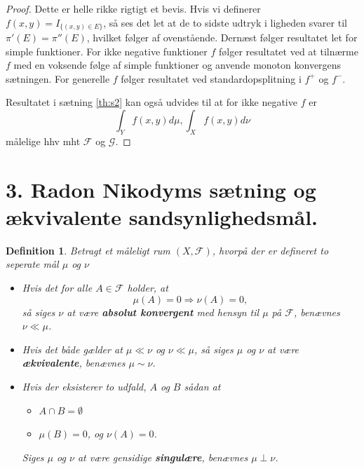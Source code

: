 \documentclass[12pt]{report}
\newtheorem{definition}[lemma]{Definition}
\theoremstyle{break}
\newtheorem*{proof}{Bevis}
\theoremstyle{break}
\newcommand{\G}{\mathcal{G}}
\newcommand{\FI}{\mathcal{F}}
\newcommand{\1}{\mathds{1}}
\begin{document}
\begin{proof}
	Dette er helle rikke rigtigt et bevis. Hvis vi definerer $f(x,y)=I_{\{ (x,y)\in E \}}$, så ses det let at de to sidste udtryk i ligheden svarer til $\pi'(E)=\pi''(E)$, hvilket følger af ovenstående. Dernæst følger resultatet let for simple funktioner. For ikke negative funktioner $f$ følger resultatet ved at tilnærme $f$ med en voksende følge af simple funktioner og anvende monoton konvergens sætningen. For generelle $f$ følger resultatet ved standardopsplitning i $f^+$ og $f^-$.
	
	Resultatet i sætning \ref{th:s2} kan også udvides til at for ikke negative $f$ er
	\[ \int_Y f(x,y)d\mu, \int_Xf(x,y)d\nu \]
	målelige hhv mht $\FI$ og $\G$.
\end{proof}
\newpage
\section*{3. Radon Nikodyms sætning og ækvivalente sandsynlighedsmål.}
\begin{definition}
	Betragt et måleligt rum $(X,\FI)$, hvorpå der er defineret to seperate mål $\mu$ og $\nu$
	\begin{itemize}
		\item Hvis det for alle $A\in \FI$ holder, at
		\[ \mu(A)=0 \Rightarrow\nu(A)=0, \]
		så siges $\nu$ at være {\bf absolut konvergent} med hensyn til $\mu$ på $\FI$, benævnes $\nu \ll \mu$.
		\item Hvis det både gælder at $\mu \ll \nu$ og $\nu \ll \mu$, så siges $\mu$ og $\nu$ at være {\bf ækvivalente}, benævnes $\mu \sim \nu$.
		\item Hvis der eksisterer to udfald, $A$ og $B$ sådan at
		\begin{itemize}
			\item $A\cap B=\emptyset$
			\item $\mu(B)=0$, og $\nu(A)=0$.
		\end{itemize}
		Siges $\mu$ og $\nu$ at være gensidige {\bf singulære}, benævnes $\mu \perp \nu$.
		
	\end{itemize}
\end{definition}
\end{document}
